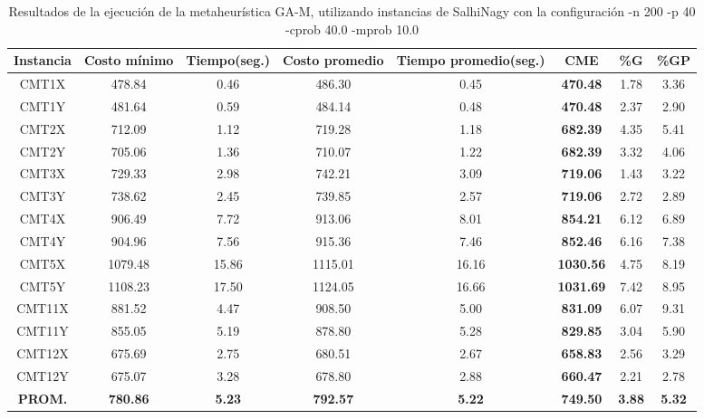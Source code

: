 \begin{table}[h]
\caption{Resultados de la ejecución de la metaheurística GA-M, utilizando instancias de SalhiNagy con la configuración -n 200 -p 40 -cprob 40.0 -mprob 10.0}
\centering
\small
\begin{tabular}{c c c c c c c c}
\hline\hline
Instancia & Costo mínimo & Tiempo(seg.) & Costo promedio & Tiempo promedio(seg.) & CME & \%G & \%GP \\ [0.5ex]
\hline
CMT1X & 478.84 & 0.46 & 
486.30 & 0.45 & \bf{470.48} & 
1.78 & 3.36\\CMT1Y & 481.64 & 0.59 & 
484.14 & 0.48 & \bf{470.48} & 
2.37 & 2.90\\CMT2X & 712.09 & 1.12 & 
719.28 & 1.18 & \bf{682.39} & 
4.35 & 5.41\\CMT2Y & 705.06 & 1.36 & 
710.07 & 1.22 & \bf{682.39} & 
3.32 & 4.06\\CMT3X & 729.33 & 2.98 & 
742.21 & 3.09 & \bf{719.06} & 
1.43 & 3.22\\CMT3Y & 738.62 & 2.45 & 
739.85 & 2.57 & \bf{719.06} & 
2.72 & 2.89\\CMT4X & 906.49 & 7.72 & 
913.06 & 8.01 & \bf{854.21} & 
6.12 & 6.89\\CMT4Y & 904.96 & 7.56 & 
915.36 & 7.46 & \bf{852.46} & 
6.16 & 7.38\\CMT5X & 1079.48 & 15.86 & 
1115.01 & 16.16 & \bf{1030.56} & 
4.75 & 8.19\\CMT5Y & 1108.23 & 17.50 & 
1124.05 & 16.66 & \bf{1031.69} & 
7.42 & 8.95\\CMT11X & 881.52 & 4.47 & 
908.50 & 5.00 & \bf{831.09} & 
6.07 & 9.31\\CMT11Y & 855.05 & 5.19 & 
878.80 & 5.28 & \bf{829.85} & 
3.04 & 5.90\\CMT12X & 675.69 & 2.75 & 
680.51 & 2.67 & \bf{658.83} & 
2.56 & 3.29\\CMT12Y & 675.07 & 3.28 & 
678.80 & 2.88 & \bf{660.47} & 
2.21 & 2.78\\\bf{PROM.} & 
\bf{780.86} & \bf{5.23} & \bf{792.57} & \bf{5.22} & \bf{749.50} & \bf{3.88} & \bf{5.32}\\[1ex]\hline
\end{tabular}
\label{table:nonlin}
\end{table} 


